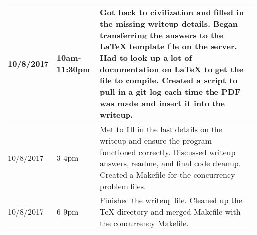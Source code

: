 \documentclass[letterpaper,10pt,titlepage]{article}
\begin{document}
\begin{tabular}{ |p{2.5cm}|p{2.5cm}|p{9cm}| }
   \hline
   10/8/2017 & 10am-11:30pm & Got back to civilization and filled in the missing writeup details. Began transferring the answers to the LaTeX template file on the server. Had to look up a lot of documentation on LaTeX to get the file to compile. Created a script to pull in a git log each time the PDF was made and insert it into the writeup.\\
   \hline
   10/8/2017 & 3-4pm & Met to fill in the last details on the writeup and ensure the program functioned correctly. Discussed writeup answers, readme, and final code cleanup. Created a Makefile for the concurrency problem files.\\
   \hline
   10/8/2017 & 6-9pm & Finished the writeup file. Cleaned up the TeX directory and merged Makefile with the concurrency Makefile.\\
   \hline
\end{tabular}
\end{document}

